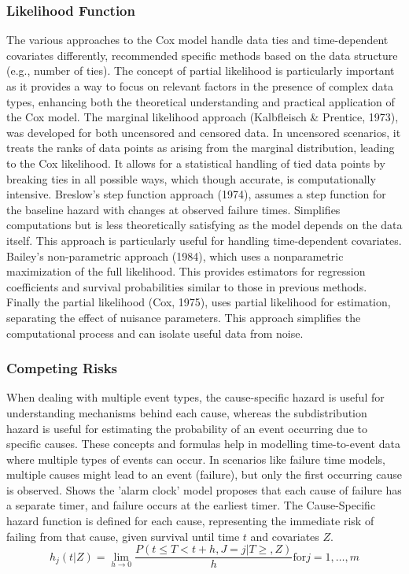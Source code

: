 \subsubsection{Likelihood Function}
\noindent The various approaches to the Cox model handle data ties and time-dependent covariates differently, \parencite{kalbfleisch_fifty_2023} recommended specific methods based on the data structure (e.g., number of ties). The concept of partial likelihood is particularly important as it provides a way to focus on relevant factors in the presence of complex data types, enhancing both the theoretical understanding and practical application of the Cox model. The marginal likelihood approach \parencite{kalbfleisch_fifty_2023} (Kalbfleisch \& Prentice, 1973), was developed for both uncensored and censored data. In uncensored scenarios, it treats the ranks of data points as arising from the marginal distribution, leading to the Cox likelihood. It allows for a statistical handling of tied data points by breaking ties in all possible ways, which though accurate, is computationally intensive. \parencite{kalbfleisch_fifty_2023} Breslow's step function approach (1974), assumes a step function for the baseline hazard with changes at observed failure times. Simplifies computations but is less theoretically satisfying as the model depends on the data itself. This approach is particularly useful for handling time-dependent covariates. \parencite{kalbfleisch_fifty_2023} Bailey's non-parametric approach (1984), which uses a nonparametric maximization of the full likelihood. This provides estimators for regression coefficients and survival probabilities similar to those in previous methods. Finally the partial likelihood \parencite{kalbfleisch_fifty_2023} (Cox, 1975), uses partial likelihood for estimation, separating the effect of nuisance parameters. This approach simplifies the computational process and can isolate useful data from noise.

\subsubsection{Competing Risks}
\noindent When dealing with multiple event types, the cause-specific hazard is useful for understanding mechanisms behind each cause, whereas the subdistribution hazard is useful for estimating the probability of an event occurring due to specific causes. These concepts and formulas help in modelling time-to-event data where multiple types of events can occur. In scenarios like failure time models, multiple causes might lead to an event (failure), but only the first occurring cause is observed. \parencite{kalbfleisch_fifty_2023} Shows the 'alarm clock' model proposes that each cause of failure has a separate timer, and failure occurs at the earliest timer. The Cause-Specific hazard function is defined for each cause, representing the immediate risk of failing from that cause, given survival until time \(t\) and covariates \(Z\).
\begin{equation} \label{eq:spesifichazard}h_{j}(t|Z) = \lim_{h \to 0} \frac{P(t \le T < t+h, J=j|T\ge,Z)}{h} \text{for} j=1,\dots,m\end{equation}

